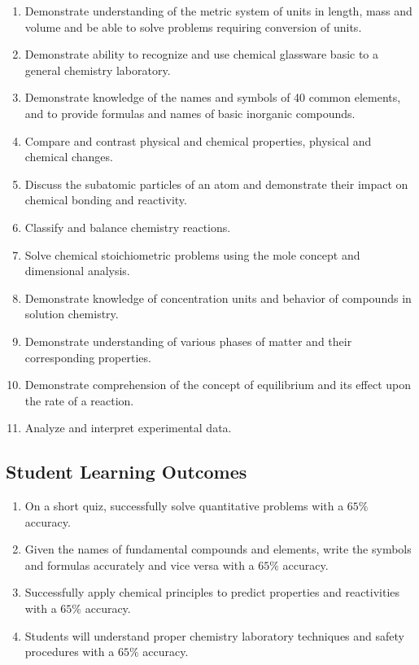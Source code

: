 \documentclass[11pt]{article}
\begin{document}
\begin{enumerate}
\item Demonstrate understanding of the metric system of units in length,
  mass and volume and be able to solve problems requiring conversion of units.
\item Demonstrate ability to recognize and use chemical glassware basic to
  a general chemistry laboratory. 
\item Demonstrate knowledge of the names and symbols of 40 common elements,
  and to provide formulas and names of basic inorganic compounds.
\item Compare and contrast physical and chemical properties, physical and chemical
  changes.
\item Discuss the subatomic particles of an atom and demonstrate their impact on
  chemical bonding and reactivity.
\item Classify and balance chemistry reactions.
\item Solve chemical stoichiometric problems using the mole concept and dimensional
  analysis.
\item Demonstrate knowledge of concentration units and behavior of compounds in
  solution chemistry.
\item Demonstrate understanding of various phases of matter and their corresponding
  properties.
\item Demonstrate comprehension of the concept of equilibrium and its effect upon the
  rate of a reaction.
\item Analyze and interpret experimental data.
\end{enumerate}

\subsection{Student Learning Outcomes}
\begin{enumerate}
\item On a short quiz, successfully solve quantitative problems with a $65\%$ accuracy.
\item Given the names of fundamental compounds and elements, write the symbols and
  formulas accurately and vice versa with a $65\%$ accuracy.
\item Successfully apply chemical principles to predict properties and reactivities
  with a $65\%$ accuracy.
\item Students will understand proper chemistry laboratory techniques and safety
  procedures with a $65\%$ accuracy.
\end{enumerate}
\end{document}
